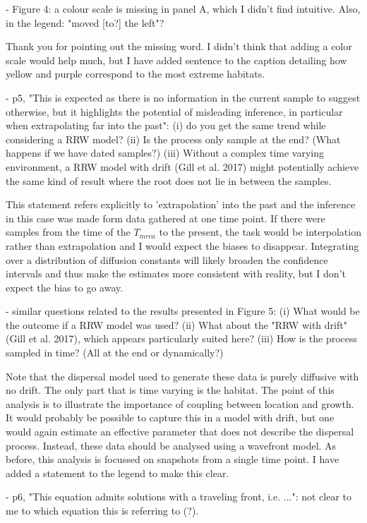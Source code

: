 \documentclass[11pt, oneside]{article}   	%
\newcommand{\response}[1]{{\color{black}{\bf Response:} #1}}
\begin{document}
- Figure 4: a colour scale is missing in panel A, which I didn't find intuitive. Also, in the legend: "moved [to?] the left"?

\response{Thank you for pointing out the missing word. I didn't think that adding a color scale would help much, but I have added sentence to the caption detailing how yellow and purple correspond to the most extreme habitats.}


- p5, "This is expected as there is no information in the current sample to suggest otherwise, but it highlights the potential of misleading inference, in particular when extrapolating far into the past": (i) do you get the same trend while considering a RRW model? (ii) Is the process only sample at the end? (What happens if we have dated samples?) (iii) Without a complex time varying environment, a RRW model with drift (Gill et al. 2017) might potentially achieve the same kind of result where the root does not lie in between the samples.

\response{This statement refers explicitly to 'extrapolation' into the past and the inference in this case was made form data gathered at one time point. If there were samples from the time of the $T_{mrca}$ to the present, the task would be interpolation rather than extrapolation and I would expect the biases to disappear. Integrating over a distribution of diffusion constants will likely broaden the confidence intervals and thus make the estimates more consistent with reality, but I don't expect the bias to go away.}


- similar questions related to the results presented in Figure 5: (i) What would be the outcome if a RRW model was used? (ii) What about the "RRW with drift" (Gill et al. 2017), which appears particularly suited here? (iii) How is the process sampled in time? (All at the end or dynamically?)

\response{Note that the dispersal model used to generate these data is purely diffusive with no drift. The only part that is time varying is the habitat. The point of this analysis is to illustrate the importance of coupling between location and growth. It would probably be possible to capture this in a model with drift, but one would again estimate an effective parameter that does not describe the dispersal process. Instead, these data should be analysed using a wavefront model. As before, this analysis is focussed on snapshots from a single time point. I have added a statement to the legend to make this clear.}


- p6, "This equation admits solutions with a traveling front, i.e. ...": not clear to me to which equation this is referring to (?).
\end{document}

